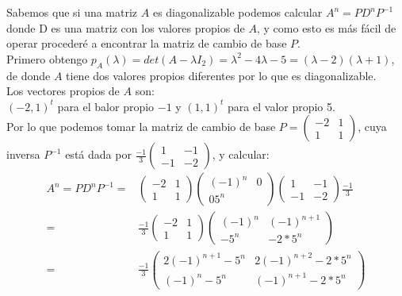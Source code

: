\documentclass[letter]{memoir} %
\newenvironment{cframed}[1][blue]
  {\begin{tcolorbox}[colframe=#1,colback=white]}
  {\end{tcolorbox}}
\begin{document}
\begin{enumerate}
\begin{cframed}[violet]
\end{cframed}
Sabemos que si una matriz $A$ es diagonalizable podemos calcular $A^n = P D^n P^{-1}$ donde D es una matriz con los valores propios de $A$, y como esto es más fácil de operar procederé a encontrar la matriz de cambio de base $P$. \\
Primero obtengo $p_A(\lambda) = det (A- \lambda I_2) = \lambda^2 -4\lambda-5 =(\lambda - 2)(\lambda + 1)$, de donde $A$ tiene dos valores propios diferentes por lo que es diagonalizable.\\
Los vectores propios de $A$ son:\\
	$(-2, 1)^t$ para el balor propio $-1$ y $(1,1)^t$ para el valor propio 5.\\
Por lo que podemos tomar la matriz de cambio de base $P = \begin{pmatrix}
															-2 & 1 \\
                                                            1 & 1
															\end{pmatrix} $, cuya inversa $P^{-1}$ está dada por $\frac{-1}{3}\begin{pmatrix}
                                             1 & -1 \\
                                             -1 & -2
                                             \end{pmatrix} $, y calcular: \\
\[
\begin{split}
A^n = PD^nP^{-1} = & \begin{pmatrix}
					-2 &1 \\
                    1 & 1
                    \end{pmatrix}
                  \begin{pmatrix}
                  (-1)^n & 0 \\
                  0 5^n
                  \end{pmatrix}
                  \begin{pmatrix}
                  1 & -1 \\
                  -1 & -2
                  \end{pmatrix} \frac{-1}{3}  \\
    =& \frac{-1}{3} \begin{pmatrix}
					-2 &1 \\
                    1 & 1
                    \end{pmatrix}
                    \begin{pmatrix}
					(-1)^n & (-1)^{n+1} \\
                    -5^n  & -2*5^n
                    \end{pmatrix} \\
     = & \frac{-1}{3} \begin{pmatrix}
					2(-1)^{n+1}  -5^n & 2(-1)^{n+2} -2*5^n \\
                    (-1)^n-5^n & (-1)^{n+1}-2*5^n
                    \end{pmatrix}
\end{split}
\]


\end{enumerate}
\end{document}
